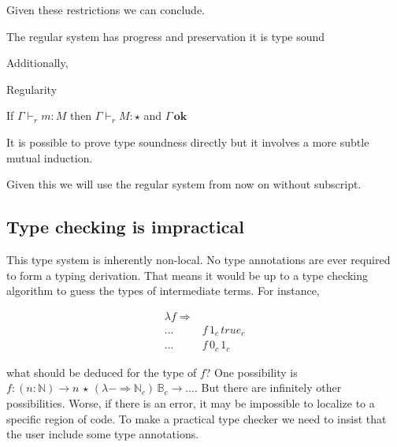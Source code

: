 Given these restrictions we can conclude.

\begin{conjecture}
The regular system has progress and preservation it is type sound
\end{conjecture}

Additionally, 
%
\begin{conjecture}
Regularity

If $\Gamma\vdash_{r}m:M$ then $\Gamma\vdash_{r}M:\star$ and $\Gamma\,\mathbf{ok}$
\end{conjecture}

It is possible to prove type soundness directly but it involves a
more subtle mutual induction.

Given this we will use the regular system from now on without subscript.



\subsection{Type checking is impractical}

This type system is inherently non-local.
No type annotations are ever required to form a typing derivation.
That means it would be up to a type checking algorithm to guess the types of intermediate terms.
For instance, 

\begin{align*}
\lambda f\Rightarrow & \,\\
... & f\,1_{c}\,true_{c}\\
... & f\,0_{c}\,1_{c}
\end{align*}
  
what should be deduced for the type of $f$? One possibility is $f:\left(n:\mathbb{N}\right)\rightarrow n\,\star\,\left(\lambda-\Rightarrow\mathbb{N}_{c}\right)\,\mathbb{B}_{c}\rightarrow...$.
But there are infinitely other possibilities.
Worse, if there is an error, it may be impossible to localize to a specific region of code.
To make a practical type checker we need to insist that the user include some type annotations.

